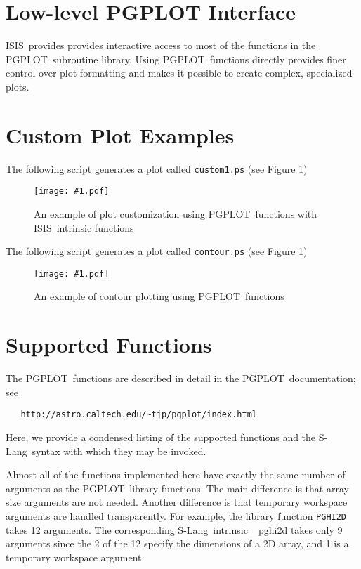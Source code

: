 \documentclass{book}
\newcommand{\putfig}[1]{\texttt{[image: \#1.pdf]}}
\newcommand{\putfig}[1]{\psfig{file=#1.ps}}
\newcommand{\isisx}{{\sc ISIS~}}
\newcommand{\pgplot}{{\sc PGPLOT}}
\newcommand{\slang}{{\sc S-Lang}}
\begin{document}
\section{Low-level PGPLOT Interface}
\label{chap:pgplot-module}

\isisx provides provides interactive access to most of the
functions in the \pgplot\ subroutine library. Using \pgplot\
functions directly provides finer control over plot formatting and
makes it possible to create complex, specialized plots.

\section{Custom Plot Examples}

The following script generates a plot called {\tt custom1.ps} (see Figure
\ref{fig:custom1})

\begin{figure}[ht]
\putfig{figures/custom1}
\caption{An example of plot customization using \pgplot\ functions with
\isisx intrinsic functions}
\label{fig:custom1}
\end{figure}



\clearpage

The following script generates a plot called {\tt contour.ps} (see Figure
\ref{fig:custom1})

\begin{figure}[ht]
\putfig{figures/contour}
\caption{An example of contour plotting using \pgplot\ functions}
\label{fig:contour}
\end{figure}



\clearpage

\section{Supported Functions}

The \pgplot\ functions are described in detail in the \pgplot\
documentation;  see
\begin{verbatim}
   http://astro.caltech.edu/~tjp/pgplot/index.html
\end{verbatim}
Here, we provide a condensed listing of the supported
functions and the \slang\ syntax with which they may be invoked.

Almost all of the functions implemented here have exactly the same
number of arguments as the \pgplot\ library functions.  The main
difference is that array size arguments are not needed.  Another
difference is that temporary workspace arguments are handled
transparently.  For example, the library function {\tt PGHI2D} takes
12 arguments.  The corresponding
\slang\  intrinsic \_pghi2d takes only 9 arguments since the 2 of the 12
specify the dimensions of a 2D array, and 1 is a temporary workspace argument.
\end{document}
